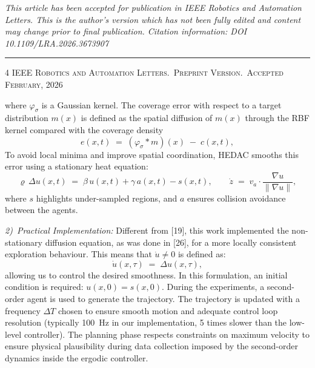 \documentclass[11pt]{article}
\begin{document}
\begin{center}
{\footnotesize\itshape
This article has been accepted for publication in IEEE Robotics and
Automation Letters. This is the author's version which has not been
fully edited and content may change prior to final publication.
Citation information: DOI 10.1109/LRA.2026.3673907\par}
\end{center}

\vspace{0.4em}
\hrule
\vspace{0.6em}

\noindent
{\footnotesize\scshape 4 \hfill IEEE Robotics and Automation Letters.\ Preprint Version.\ Accepted February, 2026}

\vspace{1.2em}

\noindent
where $\varphi_{\sigma}$ is a Gaussian kernel. The coverage error with
respect to a target distribution $m(x)$ is defined as the spatial
diffusion of $m(x)$ through the RBF kernel compared with the coverage
density
\begin{equation}
e(x,t) \;=\; (\varphi_{\sigma} * m)(x) \;-\; c(x,t),
\end{equation}
To avoid local minima and improve spatial coordination, HEDAC smooths
this error using a stationary heat equation:
\[
\varrho\,\Delta u(x,t) \;=\; \beta\,u(x,t) + \gamma\,a(x,t) - s(x,t),
\qquad
\dot{z} \;=\; v_{a}\cdot\frac{\nabla u}{\|\nabla u\|},
\]
where $s$ highlights under-sampled regions, and $a$ ensures collision
avoidance between the agents.

\vspace{0.3em}

\noindent\textit{\hspace{1em}2)~Practical Implementation:} Different
from [19], this work implemented the non-stationary diffusion
equation, as was done in [26], for a more locally consistent
exploration behaviour. This means that $\dot{u} \neq 0$ is defined as:
\begin{equation}
\dot{u}(x,\tau) \;=\; \Delta u(x,\tau),
\end{equation}
allowing us to control the desired smoothness. In this formulation,
an initial condition is required: $u(x,0) = s(x,0)$. During the
experiments, a second-order agent is used to generate the trajectory.
The trajectory is updated with a frequency $\Delta T$ chosen to ensure
smooth motion and adequate control loop resolution (typically 100~Hz
in our implementation, 5 times slower than the low-level controller).
The planning phase respects constraints on maximum velocity to ensure
physical plausibility during data collection imposed by the
second-order dynamics inside the ergodic controller.
\end{document}
